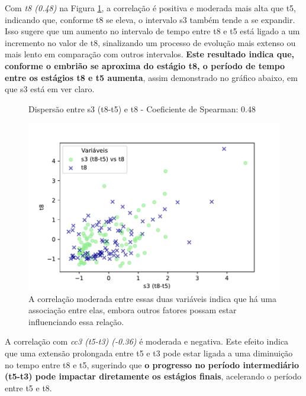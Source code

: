 Com \textit{t8 (0.48)} na Figura \ref{fig:s3-t8}, a correlação é positiva e moderada mais alta que t5, indicando que, conforme t8 se eleva, o intervalo s3 também tende a se expandir. Isso sugere que um aumento no intervalo de tempo entre t8 e t5 está ligado a um incremento no valor de t8, sinalizando um processo de evolução mais extenso ou mais lento em comparação com outros intervalos. \textbf{Este resultado indica que, conforme o embrião se aproxima do estágio t8, o período de tempo entre os estágios t8 e t5 aumenta}, assim demonstrado no gráfico abaixo, em que s3 está em ver claro. 

\begin{figure}[h]
    \captionsetup{font=footnotesize, justification=centering, labelsep=period, position=above}
    \caption{Dispersão entre s3 (t8-t5) e t8 - Coeficiente de Spearman: 0.48}
    \label{fig:s3-t8}
    \centering
    \includegraphics[scale=0.4]{figuras/Spearman/s3-t8.pdf}
    \vspace{0.3cm} 
    \caption{A correlação moderada entre essas duas variáveis indica que há uma associação entre elas, embora outros fatores possam estar influenciando essa relação.}
    \begin{minipage}{\linewidth}
        \centering
    \end{minipage}
\end{figure}
\FloatBarrier

A correlação com \textit{cc3 (t5-t3) (-0.36)} é moderada e negativa. Este efeito indica que uma extensão prolongada entre t5 e t3 pode estar ligada a uma diminuição no tempo entre t8 e t5, sugerindo que \textbf{o progresso no período intermediário (t5-t3) pode impactar diretamente os estágios finais}, acelerando o período entre t5 e t8.

